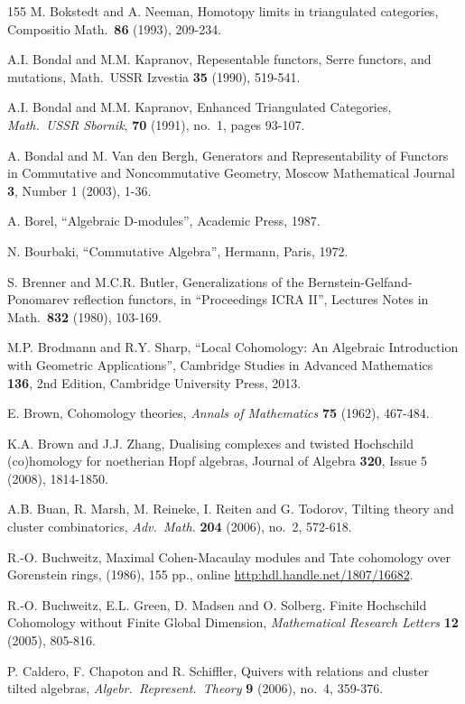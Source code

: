 \begin{thebibliography}{155}
  M. Bokstedt and A. Neeman, 
Homotopy limits in triangulated categories, 
Compositio Math.\ {\bf 86} (1993), 209-234.

 A.I. Bondal and M.M. Kapranov,
Repesentable functors, Serre functors, and mutations,
Math.\ USSR Izvestia {\bf 35} (1990), 519-541.

 A.I. Bondal and M.M. Kapranov,
Enhanced Triangulated Categories, {\em Math.\ USSR Sbornik}, {\bf 70} (1991), 
no.\ 1, pages 93-107. 

 A. Bondal and M. Van den Bergh,
Generators and Representability of Functors in Commutative and Noncommutative 
Geometry, 
Moscow Mathematical Journal {\bf 3}, Number 1 (2003), 1-36. 

 A. Borel, 
``Algebraic D-modules'',
Academic Press, 1987.  

  N. Bourbaki, ``Commutative Algebra'', Hermann, Paris, 1972.

 S. Brenner and M.C.R. Butler, 
Generalizations of the Bernstein-Gelfand-Ponomarev reflection functors, 
in ``Proceedings ICRA II'', 
Lectures Notes in Math.\ {\bf 832} (1980), 103-169.

 M.P. Brodmann and R.Y. Sharp,
``Local Cohomology: An Algebraic Introduction with Geometric Applications'',
Cambridge Studies in Advanced Mathematics {\bf 136}, 2nd Edition, 
Cambridge University Press, 2013. 

 E. Brown, 
Cohomology theories, 
{\em Annals of Mathematics} {\bf 75} (1962), 467-484.

 K.A. Brown and J.J. Zhang, 
Dualising complexes and twisted Hochschild (co)homology for noetherian Hopf 
algebras,
Journal of Algebra {\bf 320}, Issue 5 (2008), 1814-1850. 

 A.B. Buan, R. Marsh, M. Reineke, I. Reiten and G. Todorov, 
Tilting theory and cluster combinatorics,
{\em Adv.\ Math.} {\bf 204} (2006), no.\ 2, 572-618.

 R.-O. Buchweitz, 
Maximal Cohen-Macaulay modules and Tate cohomology over Gorenstein rings,
(1986), 155 pp., online 
\url{http:hdl.handle.net/1807/16682}. 

 R.-O. Buchweitz, E.L. Green, D. Madsen and O. Solberg.
Finite Hochschild Cohomology without Finite Global Dimension,
{\em Mathematical Research Letters} {\bf 12} (2005), 805-816.

 P. Caldero, F. Chapoton and R. Schiffler,  
Quivers with relations and cluster tilted algebras,
{\em Algebr.\ Represent.\ Theory} {\bf 9} (2006), no.\ 4, 359-376.  


\end{thebibliography}
